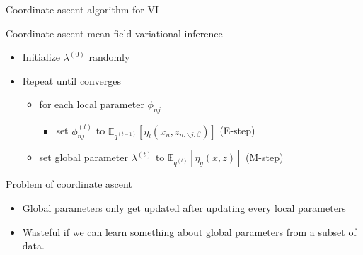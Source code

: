 \documentclass[aspectratio=169]{beamer}
\begin{document}
\begin{frame}{Coordinate ascent algorithm for VI}
    \begin{block}{Coordinate ascent mean-field variational inference}
        \begin{itemize}
            \item Initialize $\lambda^{(0)}$ randomly
            \item Repeat until converges
                \begin{itemize}
                    \item for each local parameter $\phi_{nj}$
                    \begin{itemize}
                        \item set $\phi_{nj}^{(t)}$ to $\mathbb{E}_{q^{(t-1)}}[\eta_l(x_n,z_{n,\backslash j, \beta})]$     (E-step)
                    \end{itemize}
                    \item set global parameter $\lambda^{(t)}$ to $\mathbb{E}_{q^{(t)}}[\eta_g(x,z)]$     (M-step)
                \end{itemize}
        \end{itemize}
    \end{block}
    \begin{block}{Problem of coordinate ascent}
        \begin{itemize}
            \item Global parameters only get updated after updating every local parameters
            \item Wasteful if we can learn something about global parameters from a subset of data.
        \end{itemize} 
    \end{block}
\end{frame}
\end{document}
